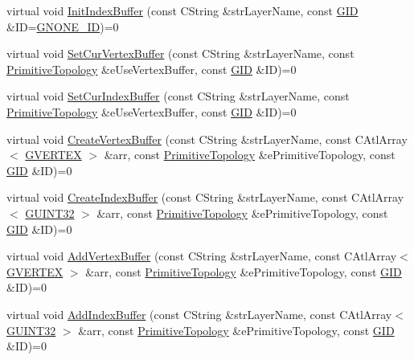 \begin{DoxyCompactItemize}
\item 
virtual void \hyperlink{class_c_g_d_c_ae870c8da319b724bf1cf07bb980abb44}{Init\+Index\+Buffer} (const C\+String \&str\+Layer\+Name, const \hyperlink{_g_types_8h_a5b96ecb16d8e437977d12cd40aa6f6d8}{G\+I\+D} \&I\+D=\hyperlink{_g_types_8h_a3d3e95c8557b67abe2ddd1726a2e4d9a}{G\+N\+O\+N\+E\+\_\+\+I\+D})=0
\item 
virtual void \hyperlink{class_c_g_d_c_a10fb1b82a91d58f8c3907a84b611e461}{Set\+Cur\+Vertex\+Buffer} (const C\+String \&str\+Layer\+Name, const \hyperlink{_g_types_8h_a940e3da6a9b57aae3de0b050e2a7af5e}{Primitive\+Topology} \&e\+Use\+Vertex\+Buffer, const \hyperlink{_g_types_8h_a5b96ecb16d8e437977d12cd40aa6f6d8}{G\+I\+D} \&I\+D)=0
\item 
virtual void \hyperlink{class_c_g_d_c_aded4569b1ee9f09f6012f1a38c804e6a}{Set\+Cur\+Index\+Buffer} (const C\+String \&str\+Layer\+Name, const \hyperlink{_g_types_8h_a940e3da6a9b57aae3de0b050e2a7af5e}{Primitive\+Topology} \&e\+Use\+Vertex\+Buffer, const \hyperlink{_g_types_8h_a5b96ecb16d8e437977d12cd40aa6f6d8}{G\+I\+D} \&I\+D)=0
\item 
virtual void \hyperlink{class_c_g_d_c_a2d56a1b4df923d08c53837b795291884}{Create\+Vertex\+Buffer} (const C\+String \&str\+Layer\+Name, const C\+Atl\+Array$<$ \hyperlink{struct_g_v_e_r_t_e_x}{G\+V\+E\+R\+T\+E\+X} $>$ \&arr, const \hyperlink{_g_types_8h_a940e3da6a9b57aae3de0b050e2a7af5e}{Primitive\+Topology} \&e\+Primitive\+Topology, const \hyperlink{_g_types_8h_a5b96ecb16d8e437977d12cd40aa6f6d8}{G\+I\+D} \&I\+D)=0
\item 
virtual void \hyperlink{class_c_g_d_c_a8971bff3ad24cf728a940694e1545da2}{Create\+Index\+Buffer} (const C\+String \&str\+Layer\+Name, const C\+Atl\+Array$<$ \hyperlink{_g_types_8h_a2e1a1c77d1349057202e2f34e071019c}{G\+U\+I\+N\+T32} $>$ \&arr, const \hyperlink{_g_types_8h_a940e3da6a9b57aae3de0b050e2a7af5e}{Primitive\+Topology} \&e\+Primitive\+Topology, const \hyperlink{_g_types_8h_a5b96ecb16d8e437977d12cd40aa6f6d8}{G\+I\+D} \&I\+D)=0
\item 
virtual void \hyperlink{class_c_g_d_c_a9c4c4c7ff05153aead065dcbe217da4b}{Add\+Vertex\+Buffer} (const C\+String \&str\+Layer\+Name, const C\+Atl\+Array$<$ \hyperlink{struct_g_v_e_r_t_e_x}{G\+V\+E\+R\+T\+E\+X} $>$ \&arr, const \hyperlink{_g_types_8h_a940e3da6a9b57aae3de0b050e2a7af5e}{Primitive\+Topology} \&e\+Primitive\+Topology, const \hyperlink{_g_types_8h_a5b96ecb16d8e437977d12cd40aa6f6d8}{G\+I\+D} \&I\+D)=0
\item 
virtual void \hyperlink{class_c_g_d_c_acc628238b0b2ae6042aa28589bc22a81}{Add\+Index\+Buffer} (const C\+String \&str\+Layer\+Name, const C\+Atl\+Array$<$ \hyperlink{_g_types_8h_a2e1a1c77d1349057202e2f34e071019c}{G\+U\+I\+N\+T32} $>$ \&arr, const \hyperlink{_g_types_8h_a940e3da6a9b57aae3de0b050e2a7af5e}{Primitive\+Topology} \&e\+Primitive\+Topology, const \hyperlink{_g_types_8h_a5b96ecb16d8e437977d12cd40aa6f6d8}{G\+I\+D} \&I\+D)=0

\end{DoxyCompactItemize}
